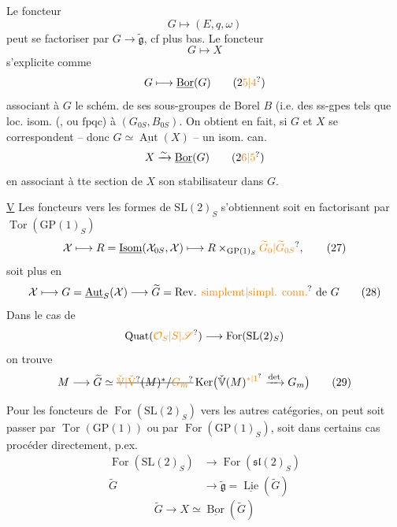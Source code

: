 Le foncteur
\[
G\longmapsto(E,q,\omega)
\]
peut se factoriser par $G\to\widetilde{\mathfrak g}$, cf plus bas.
Le foncteur
\[
G\longmapsto X
\]
s'explicite comme
\[
G\longmapsto\underline{\operatorname{Bor}}(G)\tag*{(2\unsure{5|4})}
\]
associant à $G$ le  schém. de ses sous-groupes de Borel $B$ (i.e.  des ss-gpes tels que    loc. isom.  (, ou $\mathrm{fpqc}$) à  $(G_{0S},B_{0S})$. On obtient en fait, si $G$ et $X$ se correspondent -- donc $G\simeq\underline{\operatorname{Aut}}(X)$ -- un isom. can.
\[
X\xrightarrow{\sim}\underline{\operatorname{Bor}}(G)\tag*{(2\unsure{6|5})}
\]
en associant à tte section  de $X$ son stabilisateur dans $G$.

\uline{V} Les foncteurs vers les formes de $\mathrm{SL}(2)_S$ s'obtiennent soit en factorisant par $\operatorname{Tor}(\mathrm{GP}(1)_S)$
\[
\mathcal X\longmapsto R=\underline{\operatorname{Isom}}(\mathcal X_{0S},\mathcal X)\longmapsto R\times_{\mathrm{GP}(1)_S}\unsure{\widetilde G_0|\widetilde G_{0S}},\tag*{(27)}
\]
soit plus  en
\[
\mathcal X\longmapsto G=\underline{\operatorname{Aut}}_S(\mathcal X)\longrightarrow\widetilde G=\text{Rev. \unsure{simplemt|simpl. conn.} de $G$}\tag*{(28)}
\]
Dans le cas de  
\[
\operatorname{Quat}(\unsure{\mathcal O_S|S|\mathscr S})\longrightarrow\operatorname{For}(\mathrm{SL}(2)_S)
\]
on trouve
\[
M\longrightarrow\widetilde G\simeq\deleted{\unsure{\check{\mathbb V}|\check{\mathrm V}}(M)^*/\unsure{G_m}}\operatorname{Ker}\bigl(\check{\mathbb V}(M)^{\unsure{*|1}}\xrightarrow{\det}G_m\bigr)\tag*{(29)}
\]

Pour les foncteurs de $\operatorname{For}(\mathrm{SL}(2)_S)$ vers les autres catégories, on peut soit passer par $\operatorname{Tor}(\mathrm{GP}(1))$ ou par $\operatorname{For}(\mathrm{GP}(1)_S)$, soit dans certains cas procéder directement, p.ex.
\[
\begin{aligned}
\operatorname{For}(\mathrm{SL}(2)_S)&\longrightarrow\operatorname{For}(\mathfrak{sl}(2)_S)\\
\widetilde G&\longrightarrow\widetilde{\mathfrak g}=\underline{\operatorname{Lie}}(\widetilde G)
\end{aligned}\tag*{(30)}
\]
\[
\widetilde G\longrightarrow X\simeq\underline{\operatorname{Bor}}(\widetilde G)\tag*{(31)}
\]

